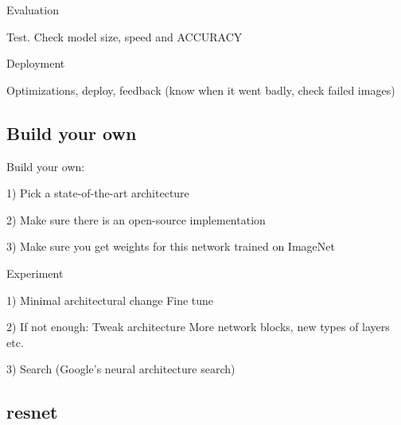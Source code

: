 Evaluation

	Test. Check model size, speed and ACCURACY

Deployment

	Optimizations, deploy, feedback (know when it went badly, check failed images)

\subsection{Build your own}

Build your own:

1) Pick a state-of-the-art architecture

2) Make sure there is an open-source implementation

3) Make sure you get weights for this network trained on ImageNet


Experiment

1) Minimal architectural change
	Fine tune

2) If not enough: Tweak architecture
	More network blocks, new types of layers etc.

3) Search (Google's neural architecture search)

\subsection{resnet}

